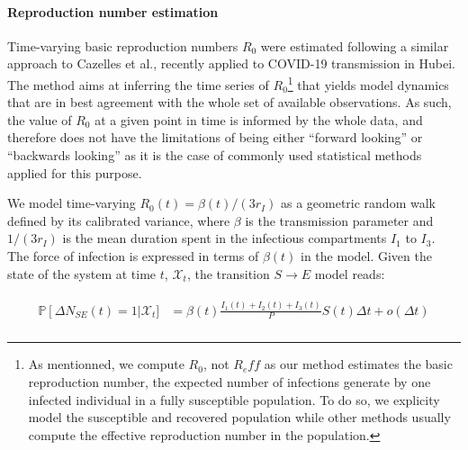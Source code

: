  \paragraph{Reproduction number estimation} Time-varying basic reproduction numbers $R_0$ were estimated following a similar approach to Cazelles et al.\cite{Cazelles:AccountingNonstationarityEpidemiology:2018}, recently applied to COVID-19 transmission in Hubei\cite{Kucharski:EarlyDynamicsTransmission:2020}. The method aims at inferring the time series of $R_0$\footnote{As mentionned, we compute $R_0$, not $R_eff$ as our method estimates the basic reproduction number, \ie the expected number of infections generate by one infected individual in a fully susceptible population. To do so, we explicity model the susceptible and recovered population while other methods usually compute the effective reproduction number in the population.} that yields model dynamics that are in best agreement with the whole set of available observations. As such, the value of $R_0$ at a given point in time is informed by the whole data, and therefore does not have the limitations of being either “forward looking” or “backwards looking” as it is the case of commonly used statistical methods applied for this purpose\cite{Wallinga:DifferentEpidemicCurves:2004,Cori:NewFrameworkSoftware:2013}. 

 We model time-varying $R_0(t) = \beta(t)/(3r_I)$ as a geometric random walk defined by its calibrated variance, where $\beta$ is the transmission parameter and $1/(3r_I)$ is the mean duration spent in the infectious compartments $I_1$ to $I_3$. The force of infection is expressed in terms of $\beta(t)$ in the model. Given the state of the system at time \(t\), \(\mathcal{X}_t\), the transition $S \longrightarrow E$ model reads:

\begin{gather}
\label{eq:stochsys}
\begin{aligned}
    \mathbb{P}\left[ \Delta N_{SE}(t) = 1 \right|\mathcal{X}_t] &=  \beta(t)  \frac{I_1(t) + I_2(t) + I_3(t)}{P} S(t) \Delta t + o(\Delta t)\\
    \end{aligned}
\end{gather}


